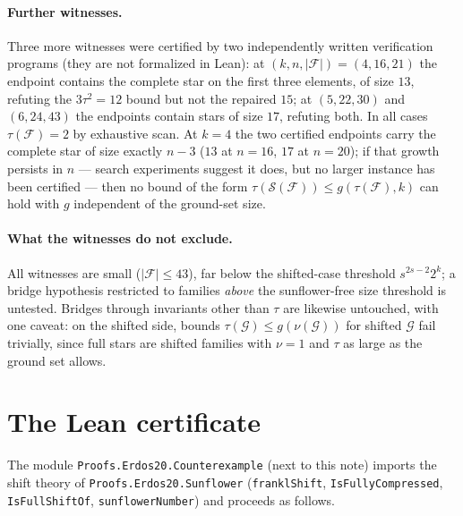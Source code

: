 \documentclass[11pt,a4paper]{article}
\theoremstyle{remark}
\newcommand{\cF}{\mathcal{F}}
\newcommand{\cG}{\mathcal{G}}
\newcommand{\cS}{\mathcal{S}}
\begin{document}
\paragraph{Further witnesses.}
Three more witnesses were certified by two independently written
verification programs (they are not formalized in Lean): at
$(k,n,|\cF|)=(4,16,21)$ the endpoint contains the complete star on the
first three elements, of size $13$, refuting the $3\tau^{2}=12$ bound
but not the repaired $15$; at $(5,22,30)$ and $(6,24,43)$ the
endpoints contain stars of size $17$, refuting both. In all cases
$\tau(\cF)=2$ by exhaustive scan. At $k=4$ the two certified endpoints
carry the complete star of size exactly $n-3$ ($13$ at $n=16$, $17$ at
$n=20$); if that growth persists in $n$ --- search experiments suggest
it does, but no larger instance has been certified --- then no bound
of the form $\tau(\cS(\cF))\le g(\tau(\cF),k)$ can hold with $g$
independent of the ground-set size.

\paragraph{What the witnesses do not exclude.}
All witnesses are small ($|\cF|\le43$), far below the shifted-case
threshold $s^{2s-2}2^{k}$; a bridge hypothesis restricted to families
\emph{above} the sunflower-free size threshold is untested. Bridges
through invariants other than $\tau$ are likewise untouched, with one
caveat: on the shifted side, bounds $\tau(\cG)\le g(\nu(\cG))$ for
shifted $\cG$ fail trivially, since full stars are shifted families
with $\nu=1$ and $\tau$ as large as the ground set allows.

\section{The Lean certificate}

The module \texttt{Proofs.Erdos20.Counterexample} (next to this note)
imports the shift theory of \texttt{Proofs.Erdos20.Sunflower}
(\texttt{franklShift}, \texttt{IsFullyCompressed},
\texttt{IsFullShiftOf}, \texttt{sunflowerNumber}) and proceeds as
follows.
\end{document}
